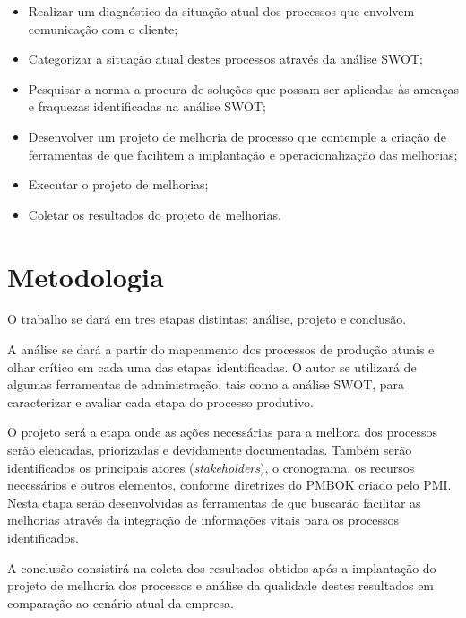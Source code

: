 \begin{itemize}

\item Realizar um diagnóstico da situação atual dos processos que envolvem comunicação com o cliente;

\item Categorizar a situação atual destes processos através da análise SWOT\footnotemark;


\item Pesquisar a norma \iso a procura de soluções que possam ser aplicadas às ameaças e fraquezas identificadas na análise SWOT;

\item Desenvolver um projeto de melhoria de processo que contemple a criação de ferramentas de \sw que facilitem a implantação e operacionalização das melhorias;

\item Executar o projeto de melhorias;

\item Coletar os resultados do projeto de melhorias.

\end{itemize}

\section{Metodologia}

O trabalho se dará em tres etapas distintas: análise, projeto e conclusão.

A análise se dará a partir do mapeamento dos processos de produção atuais e olhar crítico em cada uma das etapas identificadas. O autor se utilizará de algumas ferramentas de administração, tais como a análise SWOT, para caracterizar e avaliar cada etapa do processo produtivo.

O projeto será a etapa onde as ações necessárias para a melhora dos processos serão elencadas, priorizadas e devidamente documentadas. Também serão identificados os principais atores (\textit{stakeholders}), o cronograma, os recursos necessários e outros elementos, conforme diretrizes do PMBOK\footnotemark{} criado pelo PMI\footnotemark. Nesta etapa serão desenvolvidas as ferramentas de \sw que buscarão facilitar as melhorias através da integração de informações vitais para os processos identificados.


A conclusão consistirá na coleta dos resultados obtidos após a implantação do projeto de melhoria dos processos e análise da qualidade destes resultados em comparação ao cenário atual da empresa.